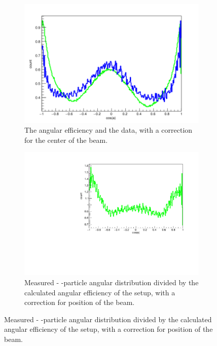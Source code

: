 \begin{figure}[h]
	\begin{subfigure}[]{.5\linewidth}
		\centering
		\includegraphics[width=\linewidth]{../figures/centerCorrections/try-3-30.png}
		\caption{The angular efficiency and the data, with a correction for the center of the beam. }
		\label{fig:centerCorrection}
	\end{subfigure}
	\begin{subfigure}[]{.5\linewidth}
		\centering
		\includegraphics[width=\linewidth]{../figures/betaAngles/dataDivEffCenterCorrected.pdf}
		\caption{Measured \be- \al-particle angular distribution divided by the calculated angular efficiency of the setup, with a correction for position of the beam. }
		\label{fig:dataDivEffCenter}
	\end{subfigure}
\end{figure}



